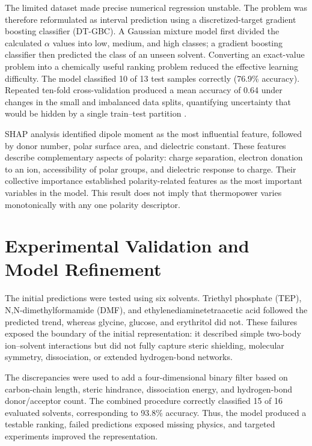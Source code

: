 The limited dataset made precise numerical regression unstable. The problem
was therefore reformulated as interval prediction using a discretized-target
gradient boosting classifier (DT-GBC). A Gaussian mixture model first divided
the calculated $\alpha$ values into low, medium, and high classes; a gradient
boosting classifier then predicted the class of an unseen solvent. Converting
an exact-value problem into a chemically useful ranking problem reduced the
effective learning difficulty. The model classified 10 of 13 test samples
correctly (76.9\% accuracy). Repeated ten-fold cross-validation produced a mean
accuracy of 0.64 under changes in the small and imbalanced data splits,
quantifying uncertainty that would be hidden by a single train--test partition
.

SHAP analysis identified dipole moment as the most influential feature,
followed by donor number, polar surface area, and dielectric constant. These
features describe complementary aspects of polarity: charge separation,
electron donation to an ion, accessibility of polar groups, and dielectric
response to charge. Their collective importance established polarity-related
features as the most important variables in the model. This result does not
imply that thermopower varies monotonically with any one polarity descriptor.

\section{Experimental Validation and Model Refinement}

The initial predictions were tested using six solvents. Triethyl phosphate
(TEP), N,N-dimethylformamide (DMF), and
ethylenediaminetetraacetic acid followed the predicted trend, whereas glycine,
glucose, and erythritol did not. These failures exposed the boundary of the
initial representation: it described simple two-body ion--solvent interactions
but did not fully capture steric shielding, molecular symmetry, dissociation,
or extended hydrogen-bond networks.

The discrepancies were used to add a four-dimensional binary filter based on
carbon-chain length, steric hindrance, dissociation energy, and hydrogen-bond
donor/acceptor count. The combined procedure correctly classified 15 of 16
evaluated solvents, corresponding to 93.8\% accuracy. Thus, the model produced
a testable ranking, failed predictions exposed missing physics, and targeted
experiments improved the representation.

